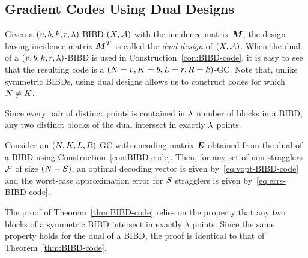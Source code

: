 \documentclass[conference,letterpaper]{IEEEtran}
\begin{document}
\subsection{Gradient Codes Using Dual Designs}
\label{sec:dual-BIBDs}



Given a $(v,b,k,r,\lambda)$-BIBD $(X,\mathcal{A})$ with the incidence matrix $\boldsymbol{M}$, the design having incidence matrix $\boldsymbol{M}^T$ is called the {\it dual design} of $(X,\mathcal{A})$. When the dual of a $(v,b,k,r,\lambda)$-BIBD is used in Construction~\ref{con:BIBD-code}, it is easy to see that the resulting code is a $(N = v, K = b,L = r, R = k)$-GC. Note that, unlike symmetric BIBDs, using dual designs allows us to construct codes for which $N \ne K$.

Since every pair of distinct points is contained in $\lambda$ number of blocks in a BIBD, %
any two distinct blocks of the dual intersect in exactly $\lambda$ points. 

\begin{theorem}
\label{thm:dual-BIBD-code}
Consider an $(N,K,L,R)$-GC with encoding matrix $\boldsymbol{E}$ obtained from the dual of a BIBD using Construction~\ref{con:BIBD-code}. Then, for any set of non-stragglers $\mathcal{F}$ of size $(N - S)$, an optimal decoding vector is given by~\eqref{eq:vopt-BIBD-code} and the worst-case approximation error for $S$ stragglers is given by~\eqref{eq:errs-BIBD-code}.
\end{theorem}
\begin{IEEEproof}
The proof of Theorem~\ref{thm:BIBD-code} relies on the property that any two blocks of a symmetric BIBD intersect in exactly $\lambda$ points. Since the same property holds for the dual of a BIBD, the proof is identical to that of Theorem~\ref{thm:BIBD-code}. 
\end{IEEEproof}
\end{document}
